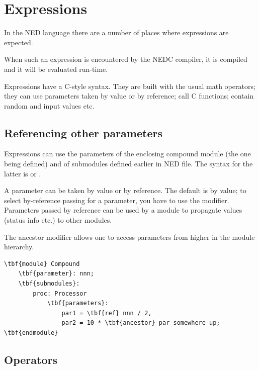 \section{Expressions}
\label{ch-ned-lang:sec:expressions}

In the NED language there are a number of places where
expressions are expected.


When such an expression is encountered by the NEDC compiler, it is
compiled and it will be evaluated
run-time.

Expressions have a C-style syntax. They are built with the usual math
operators; they can use parameters taken by
value or by reference; call C functions; contain random and input
values etc.





\subsection{Referencing other parameters}

Expressions can use the parameters of the enclosing compound module
(the one being defined) and of submodules defined earlier in NED file.
The syntax for the latter is  or .

A parameter can be taken by value or by
reference. The default is by value;
to select by-reference passing for a parameter, you have to use the
 modifier. Parameters passed by
reference can be used by a module to propagate values (status info
etc.) to other modules.

The ancestor modifier allows one to access parameters from higher
in the module hierarchy.


\begin{Verbatim}[commandchars=\\\{\}]
\tbf{module} Compound
    \tbf{parameter}: nnn;
    \tbf{submodules}:
        proc: Processor
            \tbf{parameters}:
                par1 = \tbf{ref} nnn / 2,
                par2 = 10 * \tbf{ancestor} par_somewhere_up;
\tbf{endmodule}
\end{Verbatim}


\subsection{Operators}

